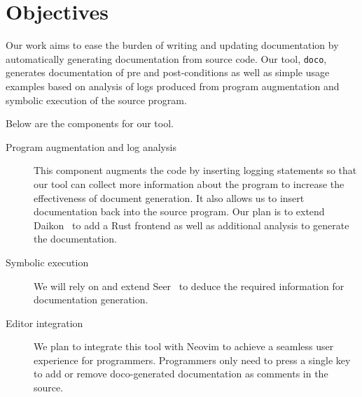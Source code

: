\section{Objectives}

Our work aims to ease the burden of writing and updating documentation by automatically generating documentation from source code. Our tool, \texttt{doco}, generates documentation of pre and post-conditions as well as simple usage examples based on analysis of logs produced from program augmentation and symbolic execution of the source program.

Below are the components for our tool.
\begin{description}
  \item [Program augmentation and log analysis] This component augments the code by inserting logging statements so that our tool can collect more information about the program to increase the effectiveness of document generation. It also allows us to insert documentation back into the source program. Our plan is to extend Daikon~\cite{Ernst:2007} to add a Rust frontend as well as additional analysis to generate the documentation.
  \item [Symbolic execution] We will rely on and extend Seer~\cite{Renshaw:2018} to deduce the required information for documentation generation.
  \item [Editor integration] We plan to integrate this tool with Neovim \cite{NeovimTeam:2018} to achieve a seamless user experience for programmers. Programmers only need to press a single key to add or remove doco-generated documentation as comments in the source.
\end{description}
